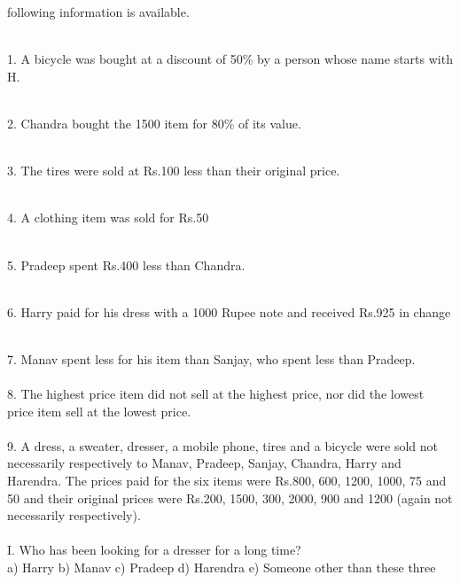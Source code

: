 \documentclass{article} %
\begin{document}
\noindent following information is available.

\noindent 

\noindent \\  1.   A bicycle was bought at a discount of 50\% by a person whose name starts with H.

\noindent 

\noindent \\  2.   Chandra bought the 1500 item for 80\% of its value.

\noindent 

\noindent \\  3.   The tires were sold at Rs.100 less than their original price.

\noindent 

\noindent \\  4.   A clothing item was sold for Rs.50

\noindent 

\noindent \\  5.   Pradeep spent Rs.400 less than Chandra.

\noindent 

\noindent \\  6.   Harry paid for his dress with a 1000 Rupee note and received Rs.925 in change


\noindent \\  7.  Manav spent less for his item than Sanjay, who spent less than Pradeep. \\
\noindent \\	 8.  The highest price item did not sell at the highest price, nor did the lowest price item sell at the lowest price. \\
\noindent \\	 9. A dress, a sweater, dresser, a mobile phone, tires and a bicycle were sold not necessarily respectively to Manav, Pradeep, Sanjay, Chandra, Harry and Harendra. The prices paid for the six items were Rs.800, 600, 1200, 1000, 75 and 50 and their original prices were Rs.200, 1500, 300, 2000, 900 and 1200 (again not necessarily respectively). \\  

\noindent \\ I.  Who has been looking for a dresser for a long time? \\  


a) Harry                                     b) Manav                                   c) Pradeep d) Harendra                              e) Someone other than these   three
\end{document}
